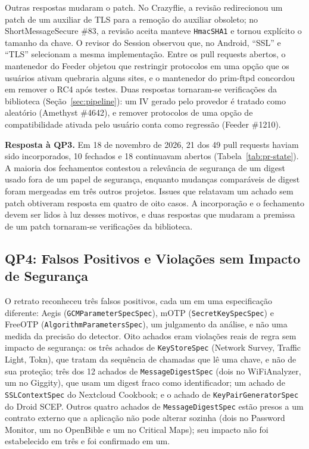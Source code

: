 \documentclass[conference]{IEEEtran}
\newcommand{\researchq}[1]{\textbf{QP#1}}
\begin{document}
Outras respostas mudaram o patch. No Crazyflie, a revisão redirecionou um patch de um
auxiliar de TLS para a remoção do auxiliar obsoleto; no ShortMessageSecure \#83,
a revisão aceita manteve \texttt{HmacSHA1} e tornou explícito o tamanho da chave.
O revisor do Session observou que, no Android, ``SSL'' e ``TLS'' selecionam a mesma
implementação. Entre os pull requests abertos, o mantenedor do Feeder objetou
que restringir protocolos em uma opção que os usuários ativam quebraria alguns sites,
e o mantenedor do prim-ftpd concordou em remover o RC4 após testes. Duas respostas
tornaram-se verificações da biblioteca (Seção~\ref{sec:pipeline}): um IV gerado pelo provedor é tratado como aleatório
(Amethyst \#4642), e remover protocolos de uma opção de compatibilidade ativada pelo usuário
conta como regressão (Feeder \#1210).

\textbf{Resposta à \researchq{3}.} Em 18 de novembro de 2026, 21 dos 49 pull
requests haviam sido incorporados, 10 fechados e 18 continuavam abertos
(Tabela~\ref{tab:pr-state}). A maioria dos fechamentos contestou a relevância de segurança de um
digest usado fora de um papel de segurança, enquanto mudanças comparáveis de digest foram
mergeadas em três outros projetos. Issues que relatavam um achado sem patch
obtiveram resposta em quatro de oito casos. A incorporação e o fechamento devem ser lidos
à luz desses motivos, e duas respostas que mudaram a premissa de um patch tornaram-se
verificações da biblioteca.

\subsection{\researchq{4}: Falsos Positivos e Violações sem Impacto de Segurança}

O retrato reconheceu três falsos positivos, cada um em uma
especificação diferente: Aegis (\texttt{GCMParameterSpecSpec}), mOTP
(\texttt{SecretKeySpecSpec}) e FreeOTP (\texttt{AlgorithmParametersSpec}),
um julgamento da análise, e não uma medida da precisão do detector. Oito
achados eram violações reais de regra sem impacto de segurança: os três
achados de \texttt{KeyStoreSpec} (Network Survey, Traffic Light, Tokn), que tratam
da sequência de chamadas que lê uma chave, e não de sua proteção; três dos 12
achados de \texttt{MessageDigestSpec} (dois no WiFiAnalyzer, um no Giggity),
que usam um digest fraco como identificador; um achado de \texttt{SSLContextSpec}
do Nextcloud Cookbook; e o achado de
\texttt{KeyPairGeneratorSpec} do Droid SCEP. Outros quatro achados de \texttt{MessageDigestSpec}
estão presos a um contrato externo que a aplicação não pode alterar sozinha
(dois no Password Monitor, um no OpenBible e um no Critical Maps); seu
impacto não foi estabelecido em três e foi confirmado em um.
\end{document}
